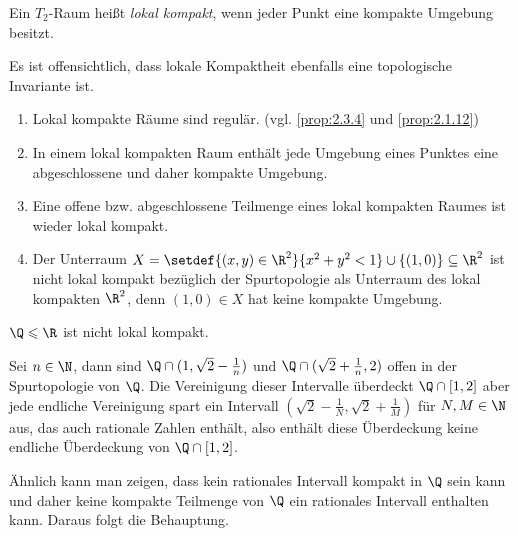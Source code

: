 \begin{defn}
\label{defn:2.3.18}
Ein $T_2$-Raum heißt \emph{lokal kompakt}, wenn jeder Punkt eine kompakte
Umgebung besitzt.\fishhere
\end{defn}

Es ist offensichtlich, dass lokale Kompaktheit ebenfalls eine topologische
Invariante ist.

\begin{prop}[Probleme]
\label{prop:2.3.19}
\begin{enumerate}
  \item Lokal kompakte Räume sind regulär. (vgl. \ref{prop:2.3.4} und
  \ref{prop:2.1.12})
  \item In einem lokal kompakten Raum enthält jede Umgebung eines Punktes eine
  abgeschlossene und daher kompakte Umgebung.
  \item Eine offene bzw. abgeschlossene Teilmenge eines lokal kompakten Raumes
  ist wieder lokal kompakt.
  \item Der Unterraum $X = \setdef{(x,y)\in\R^2}{x^2+y^2<1} \cup
  \{(1,0)\}\subseteq \R^2$ ist  nicht lokal kompakt bezüglich der Spurtopologie
  als Unterraum des lokal kompakten $\R^2$, denn $(1,0)\in X$ hat keine kompakte
  Umgebung.\fishhere
\end{enumerate}
\end{prop}

\begin{bsp}
\label{bsp:2.3.20}
$\Q\leqslant \R$ ist nicht lokal kompakt.

Sei $n\in\N$, dann sind $\Q\cap(1,\sqrt{2}-\frac{1}{n})$ und
$\Q\cap(\sqrt{2}+\frac{1}{n},2)$ offen in der Spurtopologie von $\Q$. Die
Vereinigung dieser Intervalle überdeckt $\Q\cap[1,2]$ aber jede endliche
Vereinigung spart ein Intervall
$\left(\sqrt{2}-\frac{1}{N},\sqrt{2}+\frac{1}{M}\right)$ für $N,M\in\N$ aus, das
auch rationale Zahlen enthält, also enthält diese Überdeckung keine endliche
Überdeckung von $\Q\cap[1,2]$.

Ähnlich kann man zeigen, dass kein rationales Intervall kompakt in $\Q$ sein
kann und daher keine kompakte Teilmenge von $\Q$ ein rationales Intervall
enthalten kann. Daraus folgt die Behauptung.\bsphere
\end{bsp}

